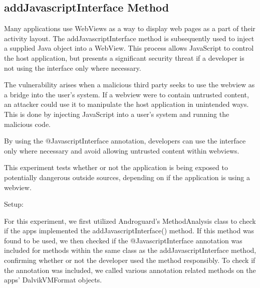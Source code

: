     \subsection{addJavascriptInterface Method}

        Many applications use WebViews as a way to display web pages as a 
        part of their activity layout. The addJavascriptInterface method 
        is subsequently used to inject a supplied Java object into a WebView. 
        This process allows JavaScript to control the host application, 
        but presents a significant security threat if a developer is not 
        using the interface only where necessary. 

        The vulnerability arises when a malicious third party seeks to use 
        the webview as a bridge into the user's system. If a webview were to
        contain untrusted content, an attacker could use it to manipulate the
        host application in unintended ways. This is done by injecting JavaScript 
        into a user's system and running the malicious code.
        
        By using the @JavascriptInterface annotation, developers can use the interface
        only where necessary and avoid allowing untrusted content within webviews.

        This experiment tests whether or not the application is being exposed to
        potentially dangerous outside sources, depending on if the application is
        using a webview.

        Setup:
        
        For this experiment, we first utilized Androguard's MethodAnalysis class to check if the apps 
        implemented the addJavascriptInterface() method. If this method was found to 
        be used, we then checked if the @JavascriptInterface annotation was included 
        for methods within the same class as the addJavascriptInterface method, confirming whether or not 
        the developer used the method responsibly. To check if the annotation was included, we called 
        various annotation related methods on the apps' DalvikVMFormat objects.
